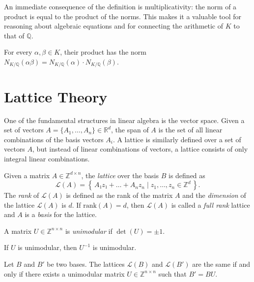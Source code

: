 An immediate consequence of the definition is multiplicativity:
the norm of a product is equal to the product of the norms.
This makes it a valuable tool for reasoning about algebraic equations
and for connecting the arithmetic of $K$ to that of $ℚ$.

\begin{lemma}
  For every $α, β ∈ K$, their product has the norm $N_{K/ℚ}(αβ) = N_{K/ℚ}(α) · N_{K/ℚ}(β)$.
\end{lemma}

\section{Lattice Theory}

One of the fundamental structures in linear algebra is the vector space.
Given a set of vectors $A = \{A_1, …, A_n\} ∈ ℝ^d$, the span of $A$ is the set
of all linear combinations of the basis vectors $A_i$.
A lattice is similarly defined over a set of vectors $A$, but instead of linear
combinations of vectors, a lattice consists of only integral linear
combinations.

\begin{definition}
  Given a matrix $A ∈ ℤ^{d × n}$, the \emph{lattice} over the basis $B$ is defined as
  \[
    \mathcal{L}(A) = \left\{\, A₁z₁ + \dots + A_n z_n \mid z_1, \dots, z_n ∈ ℤ^d \,\right\}.
  \]
  The \emph{rank} of $\mathcal{L}(A)$ is defined as the rank of the matrix $A$
  and the \emph{dimension} of the lattice $\mathcal{L}(A)$ is $d$.
  If $\mathrm{rank}(A) = d$, then $\mathcal{L}(A)$ is called a \emph{full rank}
  lattice and $A$ is a \emph{basis} for the lattice.
\end{definition}

\begin{definition}
  A matrix $U ∈ ℤ^{n×n}$ is \emph{unimodular} if $\det(U) = ±1$.
\end{definition}

\begin{lemma}
  If $U$ is unimodular, then $U^{-1}$ is unimodular.
\end{lemma}

\begin{lemma}
  Let $B$ and $B'$ be two bases.
  The lattices $\mathcal L(B)$ and $\mathcal L(B')$ are the same if and only if
  there exists a unimodular matrix $U ∈ ℤ^{n×n}$ such that $B' = BU$.
\end{lemma}

